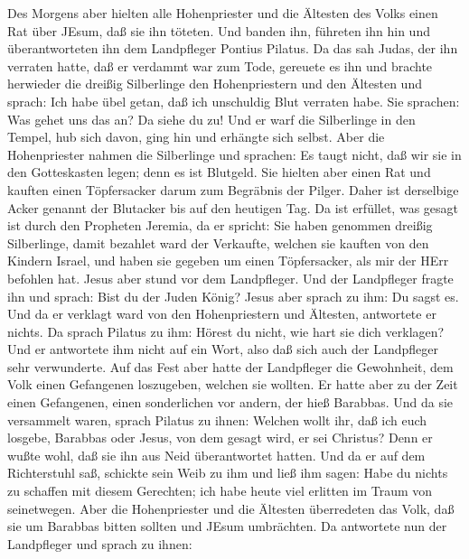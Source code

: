  Des Morgens aber hielten alle Hohenpriester und die
Ältesten des Volks einen Rat über JEsum, daß sie ihn töteten.
 Und banden ihn, führeten ihn hin und überantworteten ihn
dem Landpfleger Pontius Pilatus.  Da das sah Judas, der ihn
verraten hatte, daß er verdammt war zum Tode, gereuete es ihn und
brachte herwieder die dreißig Silberlinge den Hohenpriestern und den
Ältesten  und sprach: Ich habe übel getan, daß ich
unschuldig Blut verraten habe.  Sie sprachen: Was gehet uns
das an? Da siehe du zu! Und er warf die Silberlinge in den Tempel, hub
sich davon, ging hin und erhängte sich selbst.  Aber die
Hohenpriester nahmen die Silberlinge und sprachen: Es taugt nicht, daß
wir sie in den Gotteskasten legen; denn es ist Blutgeld. 
Sie hielten aber einen Rat und kauften einen Töpfersacker darum zum
Begräbnis der Pilger.  Daher ist derselbige Acker genannt
der Blutacker bis auf den heutigen Tag.  Da ist erfüllet,
was gesagt ist durch den Propheten Jeremia, da er spricht: Sie haben
genommen dreißig Silberlinge, damit bezahlet ward der Verkaufte, welchen
sie kauften von den Kindern Israel,  und haben sie gegeben
um einen Töpfersacker, als mir der HErr befohlen hat. 
Jesus aber stund vor dem Landpfleger. Und der Landpfleger fragte ihn und
sprach: Bist du der Juden König? Jesus aber sprach zu ihm: Du sagst es.
 Und da er verklagt ward von den Hohenpriestern und
Ältesten, antwortete er nichts.  Da sprach Pilatus zu ihm:
Hörest du nicht, wie hart sie dich verklagen?  Und er
antwortete ihm nicht auf ein Wort, also daß sich auch der Landpfleger
sehr verwunderte.  Auf das Fest aber hatte der Landpfleger
die Gewohnheit, dem Volk einen Gefangenen loszugeben, welchen sie
wollten.  Er hatte aber zu der Zeit einen Gefangenen, einen
sonderlichen vor andern, der hieß Barabbas.  Und da sie
versammelt waren, sprach Pilatus zu ihnen: Welchen wollt ihr, daß ich
euch losgebe, Barabbas oder Jesus, von dem gesagt wird, er sei Christus?
 Denn er wußte wohl, daß sie ihn aus Neid überantwortet
hatten.  Und da er auf dem Richterstuhl saß, schickte sein
Weib zu ihm und ließ ihm sagen: Habe du nichts zu schaffen mit diesem
Gerechten; ich habe heute viel erlitten im Traum von seinetwegen.
 Aber die Hohenpriester und die Ältesten überredeten das
Volk, daß sie um Barabbas bitten sollten und JEsum umbrächten.
 Da antwortete nun der Landpfleger und sprach zu ihnen:
